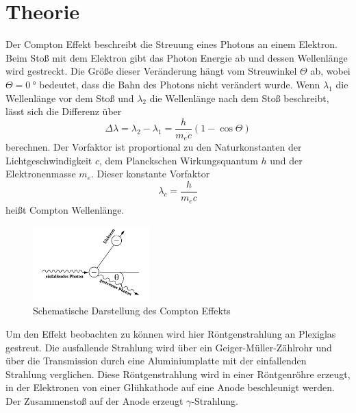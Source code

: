 \section{Theorie}
\label{sec:Theorie}




Der Compton Effekt beschreibt die Streuung eines Photons an einem Elektron.
Beim Stoß mit dem Elektron gibt das Photon Energie ab und dessen Wellenlänge wird gestreckt.
Die Größe dieser Veränderung hängt vom Streuwinkel $\Theta$ ab, wobei $\Theta=\SI{0}{\degree}$ bedeutet, dass die Bahn des Photons nicht verändert wurde.
Wenn $\lambda_1$ die Wellenlänge vor dem Stoß und $\lambda_2$ die Wellenlänge nach dem Stoß beschreibt, lässt sich die Differenz über
\begin{equation}
    \Delta \lambda = \lambda_2 - \lambda_1 = \frac{h}{m_e c}(1-\cos \Theta)
    \label{eq:differenz}
\end{equation}
berechnen.
Der Vorfaktor ist proportional zu den Naturkonstanten der Lichtgeschwindigkeit $c$, dem Planckschen Wirkungsquantum $h$ und der Elektronenmasse $m_e$.
Dieser konstante Vorfaktor 
\begin{equation}
    \lambda_c = \frac{h}{m_e c}
    \label{eq:compton-wellenlänge}
\end{equation}
heißt Compton Wellenlänge.

\begin{figure}
    \centering
    \includegraphics[width=0.4\textwidth]{images/bild_1.png}
    \caption{Schematische Darstellung des Compton Effekts}
    \label{fig:compton}
\end{figure}

Um den Effekt beobachten zu können wird hier Röntgenstrahlung an Plexiglas gestreut. 
Die ausfallende Strahlung wird über ein Geiger-Müller-Zählrohr und über die Transmission durch eine Aluminiumplatte mit der einfallenden Strahlung verglichen.
Diese Röntgenstrahlung wird in einer Röntgenröhre erzeugt, in der Elektronen von einer Glühkathode auf eine Anode beschleunigt werden. 
Der Zusammenstoß auf der Anode erzeugt $\gamma$-Strahlung.

